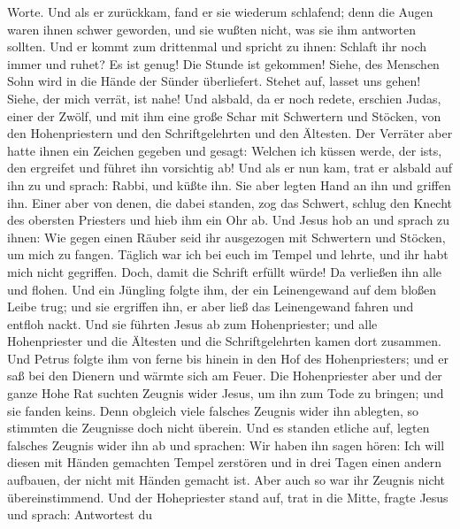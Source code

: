 Worte.  Und als er zurückkam, fand er sie wiederum
schlafend; denn die Augen waren ihnen schwer geworden, und sie wußten
nicht, was sie ihm antworten sollten.  Und er kommt zum
drittenmal und spricht zu ihnen: Schlaft ihr noch immer und ruhet? Es
ist genug! Die Stunde ist gekommen! Siehe, des Menschen Sohn wird in die
Hände der Sünder überliefert.  Stehet auf, lasset uns
gehen! Siehe, der mich verrät, ist nahe!  Und alsbald, da
er noch redete, erschien Judas, einer der Zwölf, und mit ihm eine große
Schar mit Schwertern und Stöcken, von den Hohenpriestern und den
Schriftgelehrten und den Ältesten.  Der Verräter aber
hatte ihnen ein Zeichen gegeben und gesagt: Welchen ich küssen werde,
der ist\textquotesingle s, den ergreifet und führet ihn vorsichtig ab!
 Und als er nun kam, trat er alsbald auf ihn zu und
sprach: Rabbi, und küßte ihn.  Sie aber legten Hand an
ihn und griffen ihn.  Einer aber von denen, die dabei
standen, zog das Schwert, schlug den Knecht des obersten Priesters und
hieb ihm ein Ohr ab.  Und Jesus hob an und sprach zu
ihnen: Wie gegen einen Räuber seid ihr ausgezogen mit Schwertern und
Stöcken, um mich zu fangen.  Täglich war ich bei euch im
Tempel und lehrte, und ihr habt mich nicht gegriffen. Doch, damit die
Schrift erfüllt würde!  Da verließen ihn alle und flohen.
 Und ein Jüngling folgte ihm, der ein Leinengewand auf
dem bloßen Leibe trug; und sie ergriffen ihn,  er aber
ließ das Leinengewand fahren und entfloh nackt.  Und sie
führten Jesus ab zum Hohenpriester; und alle Hohenpriester und die
Ältesten und die Schriftgelehrten kamen dort zusammen. 
Und Petrus folgte ihm von ferne bis hinein in den Hof des
Hohenpriesters; und er saß bei den Dienern und wärmte sich am Feuer.
 Die Hohenpriester aber und der ganze Hohe Rat suchten
Zeugnis wider Jesus, um ihn zum Tode zu bringen; und sie fanden keins.
 Denn obgleich viele falsches Zeugnis wider ihn ablegten,
so stimmten die Zeugnisse doch nicht überein.  Und es
standen etliche auf, legten falsches Zeugnis wider ihn ab und sprachen:
 Wir haben ihn sagen hören: Ich will diesen mit Händen
gemachten Tempel zerstören und in drei Tagen einen andern aufbauen, der
nicht mit Händen gemacht ist.  Aber auch so war ihr
Zeugnis nicht übereinstimmend.  Und der Hohepriester
stand auf, trat in die Mitte, fragte Jesus und sprach: Antwortest du

